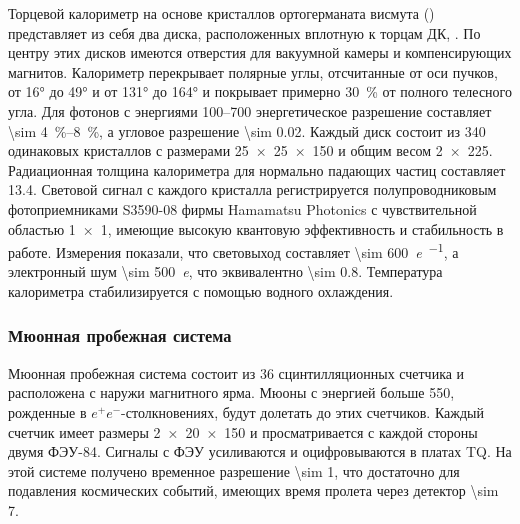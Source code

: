 Торцевой калориметр на основе кристаллов ортогерманата висмута  () представляет из себя два диска, расположенных вплотную к торцам ДК, \cite{BGOAkhmetshin2009}.
По центру этих дисков имеются отверстия для вакуумной камеры и компенсирующих магнитов.
Калориметр перекрывает полярные углы,
отсчитанные от оси пучков,
от \ang{16} до \ang{49} и от \ang{131} до \ang{164} и покрывает примерно \SI{30}{\percent} от полного телесного угла.
Для фотонов с энергиями 
\SIrange[range-phrase = --, range-units = single]{100}{700}{\MeVr}
энергетическое разрешение составляет 
\SIrange[range-phrase = --, range-units = single]{\sim 4}{8}{\percent},
а угловое разрешение \SI{\sim 0.02}{\radianru}.
Каждый диск состоит из \num{340} одинаковых кристаллов с размерами
\SI[product-units = power]{25 x 25 x 150}{\mmr}
и общим весом
\SI[product-units = single]{2 x 225}{\kgr}. 
Радиационная толщина калориметра для нормально падающих частиц составляет \SI{13.4}{\Xrad}.
Световой сигнал с каждого кристалла регистрируется полупроводниковым фотоприемниками S3590-08 фирмы Hamamatsu Photonics
с чувствительной областью \SI[product-units = power]{1 x 1}{\cmr},
имеющие высокую квантовую эффективность и стабильность в работе. 
Измерения показали,
что световыход составляет \SI{\sim 600}{\elementarycharge\per\MeVr},
а электронный шум \SI{\sim 500}{\elementarycharge},
что эквивалентно \SI{\sim 0.8}{\MeVr}.
Температура калориметра стабилизируется с помощью водного охлаждения.




\subsubsection{Мюонная пробежная система}
\label{sec:mu}

Мюонная пробежная система состоит из \num{36} сцинтилляционных счетчика и расположена с наружи магнитного ярма.
Мюоны с энергией больше \SI{550}{\MeVr},
рожденные в $e^+e^-$-столкновениях,
будут долетать до этих счетчиков. 
Каждый счетчик имеет размеры \SI[product-units = power]{2 x 20 x 150}{\cmr} и просматривается с каждой стороны двумя ФЭУ-84.
Сигналы с ФЭУ усиливаются и оцифровываются в платах TQ. 
На этой системе получено временное разрешение \SI{\sim 1}{\nsr}, что достаточно для подавления космических событий, имеющих время пролета через детектор \SI{\sim 7}{\nsr}.



